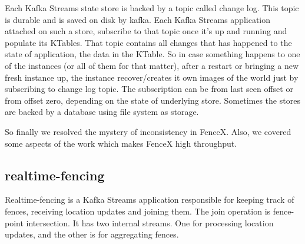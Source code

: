 \documentclass[a4]{report}
\begin{document}
    Each Kafka Streams state store is backed by a topic called change log.
    This topic is durable and is saved on disk by kafka.
    Each Kafka Streams application attached on such a store, subscribe to that topic once it's up and running and
    populate its KTables.
    That topic contains all changes that has happened to the state of application, the data in the KTable.
    So in case something happens to one of the instances (or all of them for that matter), after a restart or bringing
    a new fresh instance up, the instance recover/creates it own images of the world just by subscribing to change
    log topic.
    The subscription can be from last seen offset or from offset zero, depending on the state of underlying store.
    Sometimes the stores are backed by a database using file system as storage.

    So finally we resolved the mystery of inconsistency in FenceX. Also, we covered some aspects of the work which
    makes FenceX high throughput.

    \subsection{realtime-fencing}
    Realtime-fencing is a Kafka Streams application responsible for keeping track of fences, receiving location updates
    and joining them.
    The join operation is fence-point intersection.
    It has two internal streams.
    One for processing location updates, and the other is for aggregating fences.
\end{document}
